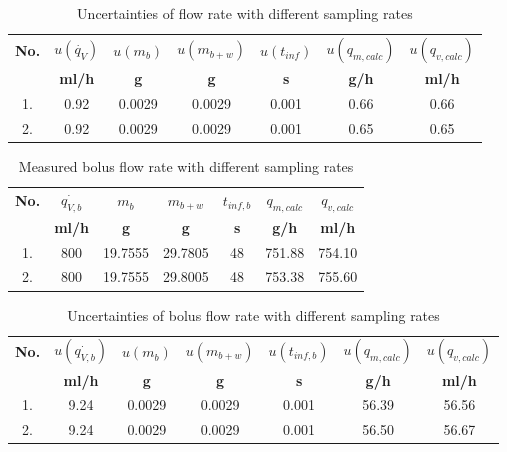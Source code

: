 \documentclass[12pt,a4paper]{article}
\begin{document}
	\begin{table}[H]
		\centering
		\begin{tabular}{|c|c|c|c|c|c|c|}
			\hline
			\textbf{No.} & $u(\dot{q_{V}})$ & $u(m_b)$ & $u(m_{b+w})$ & $u(t_{inf})$ & $u(q_{m,calc})$ & $u(q_{v,calc})$ \\
			\cline{2-7}
			& \textbf{ml/h} & \textbf{g} & \textbf{g} & \textbf{s} & \textbf{g/h} & \textbf{ml/h}\\ \hline
			1. & 0.92 & 0.0029 & 0.0029 & 0.001 & 0.66 & 0.66 \\ \hline
			2. & 0.92 & 0.0029 & 0.0029 & 0.001 & 0.65 & 0.65 \\ \hline
		\end{tabular}
		\caption{Uncertainties of flow rate with different sampling rates}
		\label{tab:uc_flow_rate}
	\end{table}
	
	\begin{table}[H]
		\centering
		\begin{tabular}{|c|c|c|c|c|c|c|}
			\hline
			\textbf{No.} & $\dot{q_{V,b}}$ & $m_b$ & $m_{b+w}$ & $t_{inf,b}$ & $q_{m,calc}$ & $q_{v,calc}$ \\
			\cline{2-7}
			& \textbf{ml/h} & \textbf{g} & \textbf{g} & \textbf{s} & \textbf{g/h} & \textbf{ml/h}\\ \hline
			1. & 800 & 19.7555 & 29.7805 & 48 & 751.88 & 754.10 \\ \hline
			2. & 800 & 19.7555 & 29.8005 & 48 & 753.38 & 755.60 \\ \hline
		\end{tabular}
		\caption{Measured bolus flow rate with different sampling rates}
		\label{tab:bolus_flow_rate}
	\end{table}
	
	\begin{table}[H]
		\centering
		\begin{tabular}{|c|c|c|c|c|c|c|}
			\hline
			\textbf{No.} & $u(\dot{q_{V,b}})$ & $u(m_b)$ & $u(m_{b+w})$ & $u(t_{inf,b})$ & $u(q_{m,calc})$ & $u(q_{v,calc})$ \\
			\cline{2-7}
			& \textbf{ml/h} & \textbf{g} & \textbf{g} & \textbf{s} & \textbf{g/h} & \textbf{ml/h}\\ \hline
			1. & 9.24 & 0.0029 & 0.0029 & 0.001 & 56.39 & 56.56 \\ \hline
			2. & 9.24 & 0.0029 & 0.0029 & 0.001 & 56.50 & 56.67 \\ \hline
		\end{tabular}
		\caption{Uncertainties of bolus flow rate with different sampling rates}
		\label{tab:uc_bolus_flow_rate}
	\end{table}
	
\end{document}
